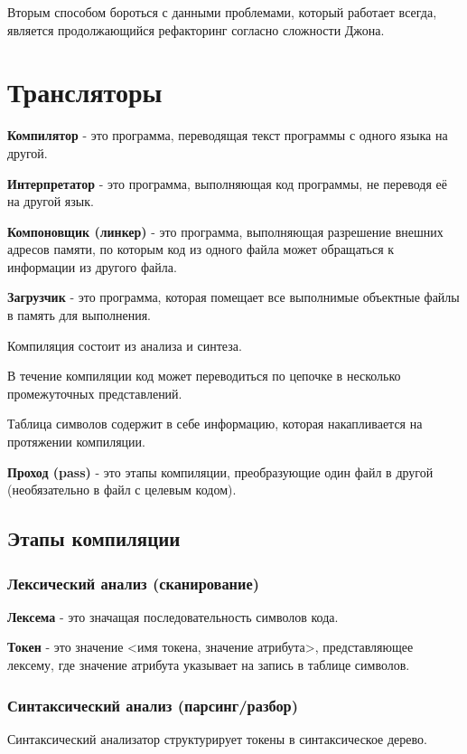 \documentclass[oneside]{book}
\begin{document}
    Вторым способом бороться с данными проблемами,
    который работает всегда, является продолжающийся
    рефакторинг согласно сложности Джона.

    \chapter{Трансляторы}
    \textbf{Компилятор} - это программа,
    переводящая текст программы
    с одного языка на другой.

    \textbf{Интерпретатор} - это программа,
    выполняющая код программы,
    не переводя её на другой язык.

    \textbf{Компоновщик (линкер)} - это программа,
    выполняющая разрешение внешних
    адресов памяти, по которым код из одного
    файла может обращаться к информации из другого файла.

    \textbf{Загрузчик} - это программа,
    которая помещает все выполнимые
    объектные файлы в память для
    выполнения.

    Компиляция состоит из анализа и синтеза.

    В течение компиляции код может
    переводиться по цепочке в несколько
    промежуточных представлений.

    Таблица символов содержит в себе информацию,
    которая накапливается на протяжении компиляции.

    \textbf{Проход (pass)} - это этапы компиляции,
    преобразующие один файл в другой
    (необязательно в файл с целевым кодом).

    \section{Этапы компиляции}
    \subsection{Лексический анализ (сканирование)}
    \textbf{Лексема} - это значащая последовательность символов кода.

    \textbf{Токен} - это значение <имя токена, значение атрибута>,
    представляющее лексему, где значение атрибута
    указывает на запись в таблице символов.

    \subsection{Синтаксический анализ (парсинг/разбор)}
    Синтаксический анализатор структурирует токены в синтаксическое дерево.
\end{document}
